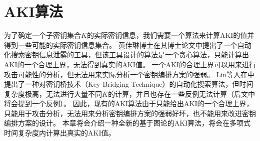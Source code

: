 
\chapter{AKI算法}
\label{chap:Alg}

为了确定一个子密钥集合$K$的实际密钥信息，我们需要一个算法来计算AKI的值并得到一些可能的实际密钥信息集合。
黄佳琳博士在其博士论文\cite{huang2014revisiting}中提出了一个自动化搜索密钥信息泄露的工具，但该工具设计的算法是一个贪心算法，只能计算出AKI的一个合理上界，无法得到真实的AKI值。
一个AKI的合理上界可以用来进行攻击可能性的分析，但无法用来实际分析一个密钥编排方案的强弱。
Lin等人在中提出了一种对密钥桥技术（Key-Bridging Technique）的自动化搜索算法，但时间复杂度极高，无法进行大量不同$K$的计算，并且也存在一些反例无法计算（后文中将会提到一个反例）。
因此，现有的AKI算法由于只能给出AKI的一个合理上界，只能用于攻击分析，无法用来分析密钥编排方案的强弱好坏，也不能用来改进密钥编排方案的设计。
本章将会介绍一种全新的基于图论的AKI算法，将会在多项式时间复杂度内计算出真实的AKI值。

